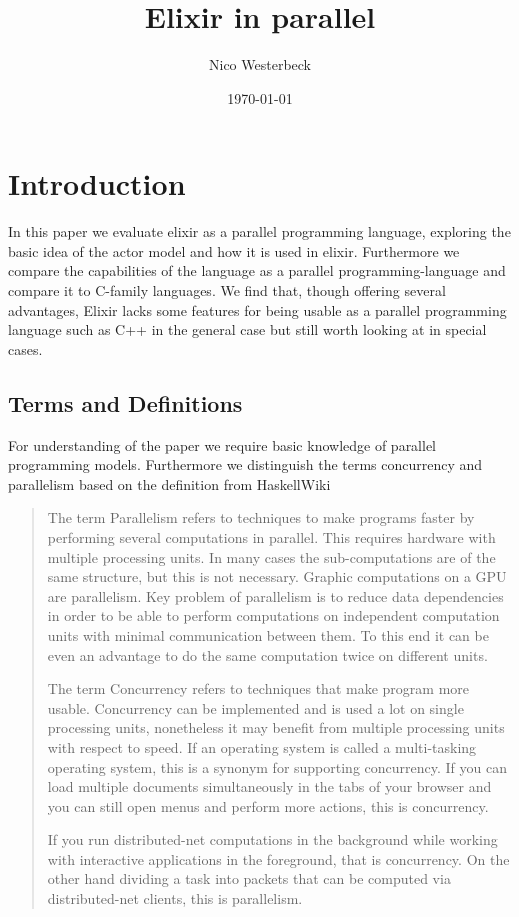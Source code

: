 \documentclass[]{paper}
\begin{document}
\title{Elixir in parallel}
\author{Nico Westerbeck}
\date{\today}
\maketitle{}
\tableofcontents

\section{Introduction}
In this paper we evaluate elixir as a parallel programming language, exploring the basic idea of the actor model and how it is used in elixir. Furthermore we compare the capabilities of the language as a parallel programming-language and compare it to C-family languages. We find that, though offering several advantages, Elixir lacks some features for being usable as a parallel programming language such as C++ in the general case but still worth looking at in special cases.

\subsection{Terms and Definitions}

For understanding of the paper we require basic knowledge of parallel programming models. Furthermore we distinguish the terms concurrency and parallelism based on the definition from HaskellWiki \cite{ParallelismConcurrency} \blockquote{The term Parallelism refers to techniques to make programs faster by performing several computations in parallel. This requires hardware with multiple processing units. In many cases the sub-computations are of the same structure, but this is not necessary. Graphic computations on a GPU are parallelism. Key problem of parallelism is to reduce data dependencies in order to be able to perform computations on independent computation units with minimal communication between them. To this end it can be even an advantage to do the same computation twice on different units.

The term Concurrency refers to techniques that make program more usable. Concurrency can be implemented and is used a lot on single processing units, nonetheless it may benefit from multiple processing units with respect to speed. If an operating system is called a multi-tasking operating system, this is a synonym for supporting concurrency. If you can load multiple documents simultaneously in the tabs of your browser and you can still open menus and perform more actions, this is concurrency.

If you run distributed-net computations in the background while working with interactive applications in the foreground, that is concurrency. On the other hand dividing a task into packets that can be computed via distributed-net clients, this is parallelism.}
\end{document}
